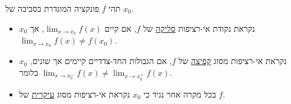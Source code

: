 תהי
$f$
פונקציה
המוגדרת בסביבה של
$x_0$.
\begin{itemize}
    \item
    $x_0$
    נקראת נקודת אי-רציפות
    \underline{סליקה}
    של
    $f$,
    אם
    קיים
    $\displaystyle\lim_{x\to x_0}f(x)$,
    אך
    $\displaystyle\lim_{x\to x_0}f(x)\neq f(x_0)$.
    \item
    $x_0$
    נקראת אי-רציפות
    מסוג \underline{קפיצה}
    של
    $f$,
    אם
    הגבולות החד-צדדיים קיימים אך
    שונים, כלומר
    $\displaystyle\lim_{x\to x_0^-}f(x)\neq\displaystyle\lim_{x\to x_0^+}f(x)$.
    \item
    בכל מקרה אחר נגיד כי
    $x_0$
    נקראת אי-רציפות
    מסוג
    \underline{עיקרית} של
    $f$.
\end{itemize}

